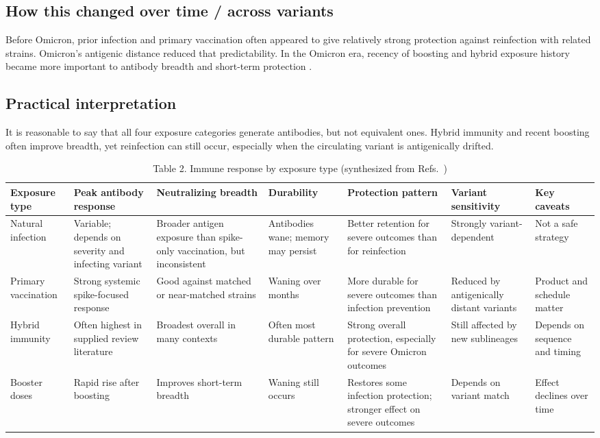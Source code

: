 \documentclass[12pt]{article}
\begin{document}
\subsection*{How this changed over time / across variants}
Before Omicron, prior infection and primary vaccination often appeared to give relatively strong protection against reinfection with related strains. Omicron's antigenic distance reduced that predictability. In the Omicron era, recency of boosting and hybrid exposure history became more important to antibody breadth and short-term protection \cite{ref3,ref5}.

\subsection*{Practical interpretation}
It is reasonable to say that all four exposure categories generate antibodies, but not equivalent ones. Hybrid immunity and recent boosting often improve breadth, yet reinfection can still occur, especially when the circulating variant is antigenically drifted.

\begin{table}[H]
\centering
\caption{Table 2. Immune response by exposure type (synthesized from Refs.~\cite{ref3,ref5})}
\begin{tabularx}{\textwidth}{>{\raggedright\arraybackslash}p{2.0cm} >{\raggedright\arraybackslash}X >{\raggedright\arraybackslash}p{2.0cm} >{\raggedright\arraybackslash}p{2.0cm} >{\raggedright\arraybackslash}X >{\raggedright\arraybackslash}p{2.0cm} >{\raggedright\arraybackslash}p{2.2cm}}
\toprule
Exposure type & Peak antibody response & Neutralizing breadth & Durability & Protection pattern & Variant sensitivity & Key caveats \\
\midrule
Natural infection & Variable; depends on severity and infecting variant & Broader antigen exposure than spike-only vaccination, but inconsistent & Antibodies wane; memory may persist & Better retention for severe outcomes than for reinfection & Strongly variant-dependent & Not a safe strategy \\
Primary vaccination & Strong systemic spike-focused response & Good against matched or near-matched strains & Waning over months & More durable for severe outcomes than infection prevention & Reduced by antigenically distant variants & Product and schedule matter \\
Hybrid immunity & Often highest in supplied review literature & Broadest overall in many contexts & Often most durable pattern & Strong overall protection, especially for severe Omicron outcomes & Still affected by new sublineages & Depends on sequence and timing \\
Booster doses & Rapid rise after boosting & Improves short-term breadth & Waning still occurs & Restores some infection protection; stronger effect on severe outcomes & Depends on variant match & Effect declines over time \\
\bottomrule
\end{tabularx}
\end{table}
\end{document}

